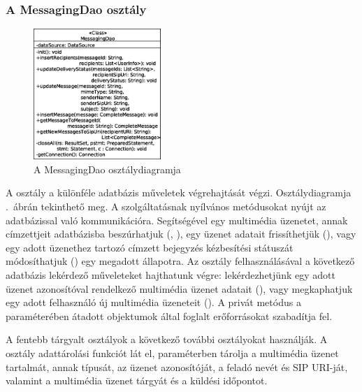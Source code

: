 \subsubsection*{A MessagingDao osztály}
\label{sec:server_messagingdao}

\begin{figure}
  \vspace{-15pt}
  \begin{center}
    \includegraphics[width=0.43\textwidth]{img/class_diagrams/server/eps/MessagingDao.eps}
  \end{center}
  \vspace{-15pt}
  \captionsetup{font=scriptsize}
  \caption{A MessagingDao osztálydiagramja}
   \label{fig:class_server_messagingdao}
  \vspace{-10pt}
\end{figure}

A  osztály a különféle adatbázis műveletek végrehajtását végzi. Osztálydiagramja .~ábrán tekinthető meg. A szolgáltatásnak nyílvános metódusokat nyújt az adatbázissal való kommunikációra. Segítségével egy multimédia üzenetet, annak címzettjeit adatbázisba beszúrhatjuk (, ), egy üzenet adatait frissíthetjük (), vagy egy adott üzenethez tartozó címzett bejegyzés kézbesítési státuszát módosíthatjuk () egy megadott állapotra. Az osztály felhasználásával a következő adatbázis lekérdező műveleteket hajthatunk végre: lekérdezhetjünk egy adott üzenet azonosítóval rendelkező multimédia üzenet adatait (), vagy megkaphatjuk egy adott felhasználó új multimédia üzeneteit (). A  privát metódus a paraméterében átadott objektumok által foglalt erőforrásokat szabadítja fel.

\medskip

A fentebb tárgyalt osztályok a következő további osztályokat használják. A  osztály adattárolási funkciót lát el, paraméterben tárolja a multimédia üzenet tartalmát, annak típusát, az üzenet azonosítóját, a feladó nevét és SIP URI-ját, valamint a multimédia üzenet tárgyát és a küldési időpontot.

